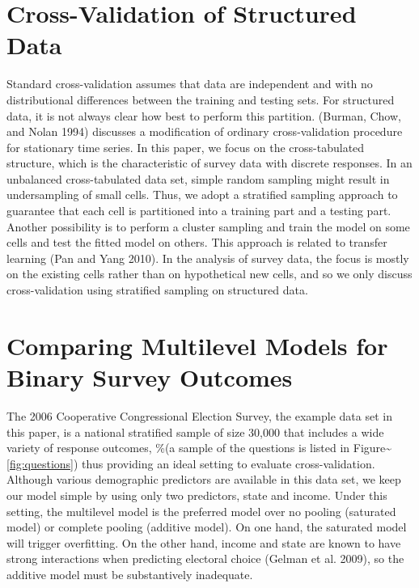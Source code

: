 \documentclass[11pt,article,oneside]{memoir}
\begin{document}
\section{Cross-Validation of Structured
Data}\label{cross-validation-of-structured-data}

Standard cross-validation assumes that data are independent and with no
distributional differences between the training and testing sets. For
structured data, it is not always clear how best to perform this
partition. (Burman, Chow, and Nolan 1994) discusses a modification of
ordinary cross-validation procedure for stationary time series. In this
paper, we focus on the cross-tabulated structure, which is the
characteristic of survey data with discrete responses. In an unbalanced
cross-tabulated data set, simple random sampling might result in
undersampling of small cells. Thus, we adopt a stratified sampling
approach to guarantee that each cell is partitioned into a training part
and a testing part. Another possibility is to perform a cluster sampling
and train the model on some cells and test the fitted model on others.
This approach is related to transfer learning (Pan and Yang 2010). In
the analysis of survey data, the focus is mostly on the existing cells
rather than on hypothetical new cells, and so we only discuss
cross-validation using stratified sampling on structured data.

\section{Comparing Multilevel Models for Binary Survey
Outcomes}\label{comparing-multilevel-models-for-binary-survey-outcomes}

The 2006 Cooperative Congressional Election Survey, the example data set
in this paper, is a national stratified sample of size 30,000 that
includes a wide variety of response outcomes, \%(a sample of the
questions is listed in Figure\textasciitilde{}\ref{fig:questions}) thus
providing an ideal setting to evaluate cross-validation. Although
various demographic predictors are available in this data set, we keep
our model simple by using only two predictors, state and income. Under
this setting, the multilevel model is the preferred model over no
pooling (saturated model) or complete pooling (additive model). On one
hand, the saturated model will trigger overfitting. On the other hand,
income and state are known to have strong interactions when predicting
electoral choice (Gelman et al. 2009), so the additive model must be
substantively inadequate.
\end{document}
